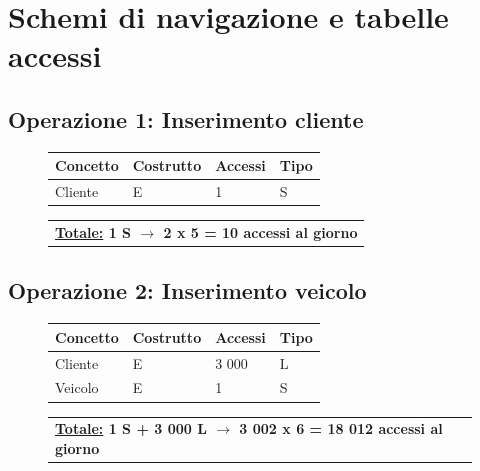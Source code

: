\documentclass[a4paper,12pt]{report}
\begin{document}
\section{Schemi di navigazione e tabelle accessi}
\subsection*{Operazione 1: Inserimento cliente}
\begin{figure}[ht]
	\centering
	\begin{tabular}{L{3cm}C{2.5cm}C{4.5cm}C{2.5cm}}
		\rule[-2mm]{0mm}{0.65cm}{}
		\textbf{Concetto} & \textbf{Costrutto} &\textbf{Accessi} & \textbf{Tipo} \\	
		\hline\rule[-2mm]{0mm}{0.65cm}{}
		Cliente & E & 1 & S \\
	\end{tabular}
	
	\begin{tabular}{C{13.9cm}}
		\rule[-2.5mm]{0mm}{0.8cm}{}	
		 \textbf{\underline{Totale:} 1 S $\to$ 2 x 5 = 10 accessi al giorno}
	\end{tabular}
\end{figure}

\subsection*{Operazione 2: Inserimento veicolo}
\begin{figure}[ht]
	\centering
	\begin{tabular}{L{3cm}C{2.5cm}C{4.5cm}C{2.5cm}}
		\rule[-2mm]{0mm}{0.65cm}{}
		\textbf{Concetto} & \textbf{Costrutto} &\textbf{Accessi} & \textbf{Tipo} \\
		\hline\rule[-2mm]{0mm}{0.65cm}{}
		Cliente & E & 3 000 & L \\
		\hline\rule[-2mm]{0mm}{0.65cm}{}
		Veicolo & E & 1 & S \\
	\end{tabular}
	
	\begin{tabular}{C{13.9cm}}
		\rule[-2.5mm]{0mm}{0.8cm}{}	
		 \textbf{\underline{Totale:} 1 S + 3 000 L $\to$ 3 002 x 6 = 18 012 accessi al giorno}
	\end{tabular}
\end{figure}
\end{document}
